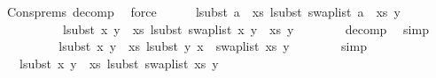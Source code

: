 \begin{isabellebody}
\ Cons{\isachardot}{\kern0pt}prems{\isacharparenleft}{\kern0pt}{}{\isacharparenright}{\kern0pt}\ decomp\ \isamarkupfalse%
\ force\isanewline
\isanewline
\ \ \ \ \isamarkupfalse%
\ {\isachardoublequoteopen}lsubst\ {\isacharparenleft}{\kern0pt}a\ {\isacharhash}{\kern0pt}\ xs{\isacharparenright}{\kern0pt}\ {\isacharparenleft}{\kern0pt}lsubst\ {\isacharparenleft}{\kern0pt}swap{\isacharunderscore}{\kern0pt}list\ {\isacharparenleft}{\kern0pt}a\ {\isacharhash}{\kern0pt}\ xs{\isacharparenright}{\kern0pt}{\isacharparenright}{\kern0pt}\ y{\isacharparenright}{\kern0pt}\ {\isacharequal}{\kern0pt}\isanewline
\ \ \ \ \ \ \ \ \ \ lsubst\ {\isacharparenleft}{\kern0pt}{\isacharparenleft}{\kern0pt}x{\isacharcomma}{\kern0pt}\ y{\isacharprime}{\kern0pt}{\isacharparenright}{\kern0pt}\ {\isacharhash}{\kern0pt}\ xs{\isacharparenright}{\kern0pt}\ {\isacharparenleft}{\kern0pt}lsubst\ {\isacharparenleft}{\kern0pt}swap{\isacharunderscore}{\kern0pt}list\ {\isacharparenleft}{\kern0pt}{\isacharparenleft}{\kern0pt}x{\isacharcomma}{\kern0pt}\ y{\isacharprime}{\kern0pt}{\isacharparenright}{\kern0pt}\ {\isacharhash}{\kern0pt}\ xs{\isacharparenright}{\kern0pt}{\isacharparenright}{\kern0pt}\ y{\isacharparenright}{\kern0pt}{\isachardoublequoteclose}\isanewline
\ \ \ \ \ \ \isamarkupfalse%
\ decomp\ \isamarkupfalse%
\ simp\isanewline
\ \ \ \ \isamarkupfalse%
\ \isamarkupfalse%
\ {\isachardoublequoteopen}{\isachardot}{\kern0pt}{\isachardot}{\kern0pt}{\isachardot}{\kern0pt}\ {\isacharequal}{\kern0pt}\ lsubst\ {\isacharparenleft}{\kern0pt}{\isacharparenleft}{\kern0pt}x{\isacharcomma}{\kern0pt}\ y{\isacharprime}{\kern0pt}{\isacharparenright}{\kern0pt}\ {\isacharhash}{\kern0pt}\ xs{\isacharparenright}{\kern0pt}\ {\isacharparenleft}{\kern0pt}lsubst\ {\isacharparenleft}{\kern0pt}{\isacharparenleft}{\kern0pt}y{\isacharprime}{\kern0pt}{\isacharcomma}{\kern0pt}\ x{\isacharparenright}{\kern0pt}\ {\isacharhash}{\kern0pt}\ swap{\isacharunderscore}{\kern0pt}list\ xs{\isacharparenright}{\kern0pt}\ y{\isacharparenright}{\kern0pt}{\isachardoublequoteclose}\isanewline
\ \ \ \ \ \ \isamarkupfalse%
\ simp\isanewline
\ \ \ \ \isamarkupfalse%
\ \isamarkupfalse%
\ {\isachardoublequoteopen}{\isachardot}{\kern0pt}{\isachardot}{\kern0pt}{\isachardot}{\kern0pt}\ {\isacharequal}{\kern0pt}\ lsubst\ {\isacharparenleft}{\kern0pt}{\isacharparenleft}{\kern0pt}x{\isacharcomma}{\kern0pt}\ y{\isacharprime}{\kern0pt}{\isacharparenright}{\kern0pt}\ {\isacharhash}{\kern0pt}\ xs{\isacharparenright}{\kern0pt}\ {\isacharparenleft}{\kern0pt}lsubst\ {\isacharparenleft}{\kern0pt}swap{\isacharunderscore}{\kern0pt}list\ xs{\isacharparenright}{\kern0pt}\ y{\isacharparenright}{\kern0pt}{\isachardoublequoteclose}\isanewline

\end{isabellebody}
